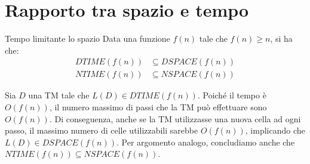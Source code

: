 \section{Rapporto tra spazio e tempo}
\begin{Thm}{Tempo limitante lo spazio}{}\label{thm:tempo-limitante-spazio}
Data una funzione $f(n)$ tale che $f(n)\geq n$, si ha che:
\begin{align*}
DTIME(f(n)) &\subseteq DSPACE(f(n))\\
NTIME(f(n)) &\subseteq NSPACE(f(n))    
\end{align*}
\begin{demonstration}
Sia $D$ una TM tale che $L(D)\in DTIME(f(n))$. Poiché il tempo è $O(f(n))$, il numero massimo di passi che la TM può effettuare sono $O(f(n))$. Di conseguenza, anche se la TM utilizzasse una nuova cella ad ogni passo, il massimo numero di celle utilizzabili sarebbe $O(f(n))$, implicando che $L(D)\in DSPACE(f(n))$. Per argomento analogo, concludiamo anche che $NTIME(f(n)) \subseteq NSPACE(f(n))$.
\end{demonstration}    
\end{Thm}

